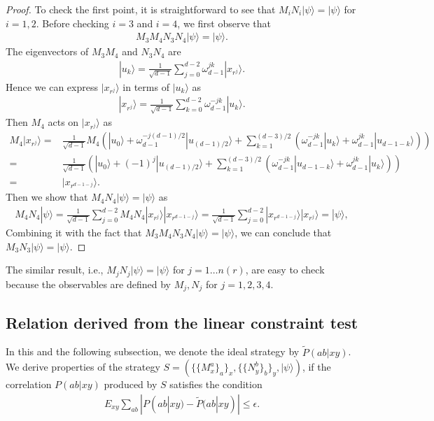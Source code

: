 \documentclass[11pt,letterpaper]{article}
\newcommand{\ket}[1]{|#1\rangle}
\newcommand{\1}{\mathbb{1}}
\newcommand{\nr}{n(r)}
\newcommand{\pr}[2]{P(#1|#2)}
\newcommand{\tpr}[2]{\tilde{P}(#1|#2)}
\newcommand{\ep}{\epsilon}
\theoremstyle{definition}
\begin{document}
\begin{proof}
	To check the first point, it is straightforward to see that $M_iN_i \ket{\psi} = \ket{\psi}$ for $i = 1,2$.
	Before checking $i=3$ and $i=4$, we first observe that
	\begin{align}
		M_3M_4 N_3 N_4 \ket{\psi} = \ket{\psi}.
	\end{align}
	The eigenvectors of $M_3M_4$ and $N_3N_4$ are 
        \begin{align}
        		\ket{u_k} = \frac{1}{\sqrt{d-1}} \sum_{j=0}^{d-2} \omega_{d-1}^{jk} \ket{x_{r^j}}.
        \end{align}
        Hence we can express $\ket{x_{r^j}}$ in terms of $\ket{u_k}$ as 
        \begin{align}
        		\ket{x_{r^j}} = \frac{1}{\sqrt{d-1}} \sum_{k=0}^{d-2} \omega_{d-1}^{-jk} \ket{u_k}.
        \end{align}
        Then $M_4$ acts on $\ket{x_{r^j}}$ as 
        \begin{align}
        		M_4 \ket{x_{r^j}} =& \frac{1}{\sqrt{d-1}} M_4\left(\ket{u_0} + \omega_{d-1}^{-j(d-1)/2}\ket{u_{(d-1)/2}}  + 
        	\sum_{k=1}^{(d-3)/2} (\omega_{d-1}^{-jk} \ket{u_k} + \omega_{d-1}^{jk} \ket{u_{d-1-k}})\right) \\
        	=&\frac{1}{\sqrt{d-1}} \left(\ket{u_0} + (-1)^j\ket{u_{(d-1)/2}}  + 
        	\sum_{k=1}^{(d-3)/2} (\omega_{d-1}^{-jk} \ket{u_{d-1-k}} + \omega_{d-1}^{jk} \ket{u_{k}})\right) \\
        	=& \ket{x_{r^{d-1-j}}}.
        \end{align}
        Then we show that $M_4  N_4 \ket{\psi} = \ket{\psi}$ as 
        \begin{align}
        	M_4 N_4 \ket{\psi} = \frac{1}{\sqrt{d-1}}  \sum_{j=0}^{d-2} M_4  N_4 \ket{x_{r^j}} \ket{x_{r^{d-1-j}}} 
        	= \frac{1}{\sqrt{d-1}} \sum_{j=0}^{d-2} \ket{x_{r^{d-1-j}}} \ket{x_{r^{j}}} =\ket{\psi},
        \end{align}
	Combining it with the fact that $M_3M_4 N_3N_4 \ket{\psi} = \ket{\psi}$, we can conclude that
	$M_3N_3 \ket{\psi} = \ket{\psi}$.
\end{proof}
The similar result, i.e., $M_jN_j \ket{\psi} = \ket{\psi}$ for $j = 1 \dots \nr$, are easy to check because the observables are defined by $M_j, N_j$ for $j=1,2,3,4$.
\subsection{Relation derived from the linear constraint test}
\label{sec:rel_lct}
In this and the following subsection, we denote the ideal strategy by $\tpr{ab}{xy}$.
We derive properties of the strategy $S = ( \{\{M_x^a\}_a\}_x, \{\{N_y^b\}_b\}_y, \ket{\psi} )$,
if the correlation $\pr{ab}{xy}$ produced by $S$ satisfies the condition
\begin{align}
	E_{xy} \sum_{ab} |\pr{ab}{xy} - \tpr{ab}{xy}| \leq \ep.
\end{align}
\end{document}
